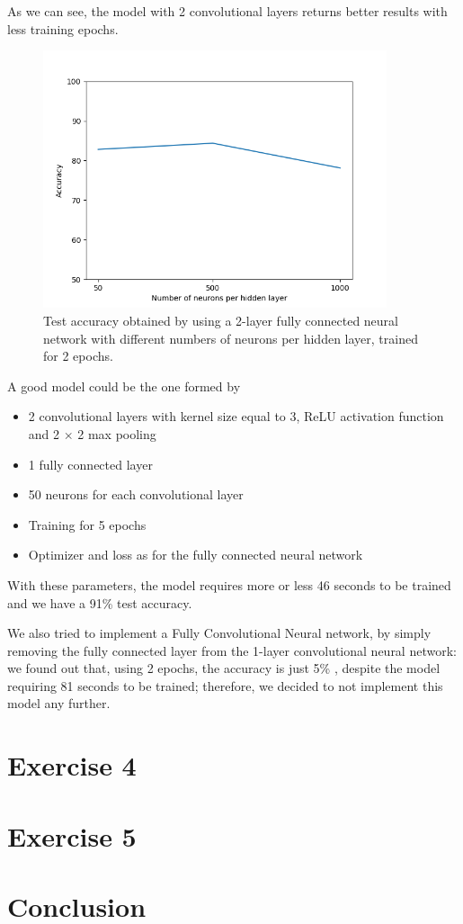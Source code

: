 \documentclass[12pt]{article}
\begin{document}
As we can see, the model with 2 convolutional layers returns better results with less training epochs.

\begin{figure}[h!]
	\centering
	\includegraphics[width = 0.9\textwidth]{ex3_CNN2l_accuracy-neurons.png}
	\caption{Test accuracy obtained by using a 2-layer fully connected neural network with different numbers of neurons per hidden layer, trained for 2 epochs.}
	\label{fig:ex3_CNN_neurons}
\end{figure}

A good model could be the one formed by 
\begin{itemize}
	\item 2 convolutional layers with kernel size equal to 3, ReLU activation function and 2 $\times$ 2 max pooling
	\item 1 fully connected layer
	\item 50 neurons for each convolutional layer
	\item Training for 5 epochs
	\item Optimizer and loss as for the fully connected neural network
\end{itemize}

With these parameters, the model requires more or less 46 seconds to be trained and we have a 91\% test accuracy.\newline

We also tried to implement a Fully Convolutional Neural network, by simply removing the fully connected layer from the 1-layer convolutional neural network: we found out that, using 2 epochs, the accuracy is just 5\% , despite the model requiring 81 seconds to be trained; therefore, we decided to not implement this model any further.


\section{Exercise 4}

\section{Exercise 5}

\section{Conclusion}

% 
% 
\end{document}
